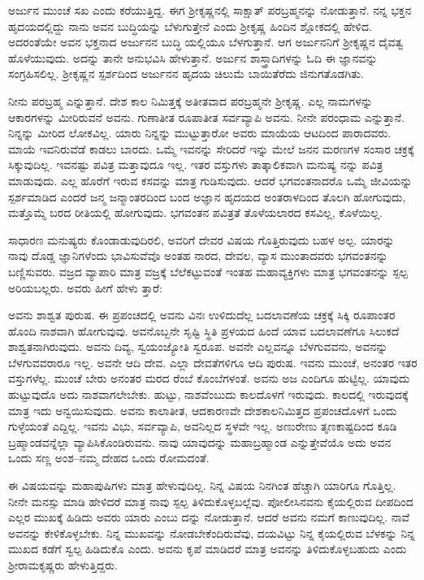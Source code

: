 ಅರ್ಜುನ ಮುಂಚೆ ಸಖ ಎಂದು ಕರೆಯುತ್ತಿದ್ದ. ಈಗ ಶ್ರೀಕೃಷ್ಣನಲ್ಲಿ ಸಾಕ್ಷಾತ್ ಪರಬ್ರಹ್ಮನನ್ನು ನೋಡುತ್ತಾನೆ. ನನ್ನ ಭಕ್ತನ ಹೃದಯದಲ್ಲಿದ್ದು ನಾನು ಅವನ ಬುದ್ಧಿಯನ್ನು ಬೆಳುಗುತ್ತೇನೆ ಎಂದು ಶ್ರೀಕೃಷ್ಣ ಹಿಂದಿನ ಶ್ಲೋಕದಲ್ಲಿ ಹೇಳಿದ. ಅದರಂತೆಯೇ ಅವನ ಭಕ್ತನಾದ ಅರ್ಜುನನ ಬುದ್ಧಿ ಯಲ್ಲಿಯೂ ಬೆಳಗುತ್ತಾನೆ. ಆಗ ಅರ್ಜುನನಿಗೆ ಶ್ರೀಕೃಷ್ಣನ ದೈವತ್ವ ಹೊಳೆಯುವುದು. ಅದನ್ನು ತಾನೇ ಅನುಭವಿಸಿ ಹೇಳುತ್ತಾನೆ. ಅರ್ಜುನ ಶಾಸ್ತ್ರಾದಿಗಳನ್ನು ಓದಿ ಈ ಜ್ಞಾನವನ್ನು ಸಂಗ್ರಹಿಸಲಿಲ್ಲ. ಶ್ರೀಕೃಷ್ಣನ ಸ್ಪರ್ಶದಿಂದ ಅರ್ಜುನನ ಹೃದಯ ಚಿಲುಮೆ ಬಾಯಿತೆರೆದು ಜಿನುಗತೊಡಗಿತು.

ನೀನು ಪರಬ್ರಹ್ಮ ಎನ್ನುತ್ತಾನೆ. ದೇಶ ಕಾಲ ನಿಮಿತ್ತಕ್ಕೆ ಅತೀತವಾದ ಪರಬ್ರಹ್ಮನೇ ಶ್ರೀಕೃಷ್ಣ. ಎಲ್ಲ ನಾಮಗಳನ್ನು ಆಕಾರಗಳನ್ನು ಮೀರಿರುವನೆ ಅವನು. ಗುಣಾತೀತ ರೂಪಾತೀತ ಸರ್ವವ್ಯಾಪಿ ಅವನು. ನೀನೇ ಪರಂಧಾಮ ಎನ್ನುತ್ತಾನೆ. ನಿನ್ನನ್ನು ಮೀರಿದ ಲೋಕವಿಲ್ಲ. ಯಾರು ನಿನ್ನನ್ನು ಮುಟ್ಟುತ್ತಾರೋ ಅವರು ಮಾಯೆಯ ಆಟದಿಂದ ಪಾರಾದವರು. ಮಾಯೆ ಇವನಿರುವೆಡೆ ಕಾಡಲು ಬಾರದು. ಒಮ್ಮೆ ಇವನನ್ನು ಸೇರಿದರೆ ಇನ್ನು ಮೇಲೆ ಜನನ ಮರಣಗಳ ಸಂಸಾರ ಚಕ್ರಕ್ಕೆ ಸಿಕ್ಕುವುದಿಲ್ಲ. ಇವನಷ್ಟು ಪವಿತ್ರ ಮತ್ತಾವುದೂ ಇಲ್ಲ. ಇತರ ವಸ್ತುಗಳು ತಾತ್ಕಾಲಿಕವಾಗಿ ಮನುಷ್ಯ ನನ್ನು ಪವಿತ್ರ ಮಾಡುವುದು. ಎಲ್ಲ ಹೊರೆಗೆ ಇರುವ ಕಸವನ್ನು ಮಾತ್ರ ಗುಡಿಸುವುದು. ಆದರೆ ಭಗವಂತನಾದರೊ ಒಮ್ಮೆ ಜೀವಿಯನ್ನು ಸ್ಪರ್ಶಮಾಡಿದ ಎಂದರೆ ಜನ್ಮ ಜನ್ಮಾಂತರದಿಂದ ಬಂದ ಅಜ್ಞಾನ ಹೃದಯದ ಅಂತರಾಳದಿಂದ ತೊಲಗಿ ಹೋಗುವುದು, ಮತ್ತೊಮ್ಮೆ ಬರದ ರೀತಿಯಲ್ಲಿ ಹೋಗುವುದು. ಭಗವಂತನ ಪವಿತ್ರತೆ ತೊಳೆಯಲಾರದ ಕಸವಿಲ್ಲ, ಕೊಳೆಯಿಲ್ಲ.

ಸಾಧಾರಣ ಮನುಷ್ಯರು ಕೊಂಡಾಡುವುದಿರಲಿ, ಅವರಿಗೆ ದೇವರ ವಿಷಯ ಗೊತ್ತಿರುವುದು ಬಹಳ ಅಲ್ಪ. ಯಾರನ್ನು ನಾವು ದೊಡ್ಡ ಜ್ಞಾನಿಗಳೆಂದು ಭಾವಿಸುವೆವೊ ಅಂತಹ ನಾರದ, ದೇವಲ, ವ್ಯಾಸ ಮುಂತಾದವರು ಭಗವಂತನನ್ನು ಬಣ್ಣಿಸುವರು. ವಜ್ರದ ವ್ಯಾಪಾರಿ ಮಾತ್ರ ವಜ್ರಕ್ಕೆ ಬೆಲೆಕಟ್ಟುವಂತೆ ಇಂತಹ ಮಹಾವ್ಯಕ್ತಿಗಳು ಮಾತ್ರ ಭಗವಂತನನ್ನು ಸ್ಪಲ್ಪ ಅರಿಯಬಲ್ಲರು. ಅವರು ಹೀಗೆ ಹೇಳು ತ್ತಾರೆ:

ಅವನು ಶಾಶ್ವತ ಪುರುಷ. ಈ ಪ್ರಪಂಚದಲ್ಲಿ ಅವನು ವಿನಃ ಉಳಿದುದೆಲ್ಲ ಬದಲಾವಣೆಯ ಚಕ್ರಕ್ಕೆ ಸಿಕ್ಕಿ ರೂಪಾಂತರ ಹೊಂದಿ ನಾಶವಾಗಿ ಹೋಗುವುವು. ಅವನೊಬ್ಬನೇ ಸೃಷ್ಟಿ ಸ್ಥಿತಿ ಪ್ರಳಯದ ಹಿಂದೆ ಯಾವ ಬದಲಾವಣೆಗೂ ಸಿಲುಕದೆ ಶಾಶ್ವತನಾಗಿರುವುದು. ಅವನು ದಿವ್ಯ, ಸ್ವಯಂಜ್ಯೋತಿ ಸ್ವರೂಪ. ಅವನೇ ಎಲ್ಲವನ್ನೂ ಬೆಳಗುವವನು, ಅವನನ್ನು ಬೆಳಗುವವರಾರೂ ಇಲ್ಲ. ಅವನೇ ಆದಿ ದೇವ. ಎಲ್ಲಾ ದೇವತೆಗಳಿಗೂ ಆದಿ ಪುರುಷ. ಇವನು ಮುಂಚೆ, ಅನಂತರ ಇತರ ವಸ್ತುಗಳೆಲ್ಲ. ಮುಂಚೆ ಬೇರು ಅನಂತರ ಮರದ ರೆಂಬೆ ಕೊಂಬೆಗಳಂತೆ. ಅವನು ಅಜ ಎಂದಿಗೂ ಹುಟ್ಟಿಲ್ಲ. ಯಾವುದು ಹುಟ್ಟುವುದೊ ಅದು ನಾಶವಾಗಲೇಬೇಕು. ಹುಟ್ಟು, ನಾಶವೆಂಬುದು ಕಾಲದೊಳಗೆ ಇರುವುದು. ಕಾಲದಲ್ಲಿ ಇರುವುದಕ್ಕೆ ಮಾತ್ರ ಇದು ಅನ್ವಯಿಸುವುದು. ಅವನು ಕಾಲಾತೀತ, ಆದಕಾರಣವೇ ದೇಶಕಾಲನಿಮಿತ್ತದ ಪ್ರಪಂಚದೊಳಗೆ ಒಂದು ಗುಳ್ಳೆಯಂತೆ ಎದ್ದಿಲ್ಲ. ಇವನು ವಿಭು, ಸರ್ವವ್ಯಾಪಿ, ಅವನಿಲ್ಲದ ಸ್ಥಳವೇ ಇಲ್ಲ. ಅಣುರೇಣು ತೃಣಕಾಷ್ಟದಿಂದ ಕೂಡಿ ಬ್ರಹ್ಮಾಂಡವನ್ನೆಲ್ಲಾ ವ್ಯಾಪಿಸಿಕೊಂಡಿರುವನು. ನಾವು ಯಾವುದನ್ನು ಮಹಾಬ್ರಹ್ಮಾಂಡ ಎನ್ನುತ್ತೇವೆಯೊ ಅದು ಅವನ ಒಂದು ಸಣ್ಣ ಅಂಶ–ನಮ್ಮ ದೇಹದ ಒಂದು ರೋಮದಂತೆ.

ಈ ವಿಷಯವನ್ನು ಮಹಾಪುಷಿಗಳು ಮಾತ್ರ ಹೇಳುವುದಿಲ್ಲ. ನಿನ್ನ ವಿಷಯ ನಿನಗಿಂತ ಹೆಚ್ಚಾಗಿ ಯಾರಿಗೂ ಗೊತ್ತಿಲ್ಲ. ನೀನೇ ಮನಸ್ಸು ಮಾಡಿ ಹೇಳಿದರೆ ಮಾತ್ರ ನಾವು ಸ್ಪಲ್ಪ ತಿಳಿದುಕೊಳ್ಳಬಲ್ಲೆವು. ಪೋಲೀಸಿನವನು ಕೈಯಲ್ಲಿರುವ ದೀಪದಿಂದ ಎಲ್ಲರ ಮುಖಕ್ಕೆ ಹಿಡಿದು ಅವರು ಯಾರು ಎಂಬು ದನ್ನು ನೋಡುತ್ತಾನೆ. ಆದರೆ ಅವನು ನಮಗೆ ಕಾಣುವುದಿಲ್ಲ. ನಾವೆ ಅವನನ್ನು ಕೇಳಿಕೊಳ್ಳಬೇಕು. ನಿನ್ನ ಮುಖವನ್ನು ನೋಡಬೇಕೆಂದಿರುವೆವು, ದಯವಿಟ್ಟು ನಿನ್ನ ಕೈಯಲ್ಲಿರುವ ಬೆಳಕನ್ನು ನಿನ್ನ ಮುಖದ ಕಡೆಗೆ ಸ್ವಲ್ಪ ಹಿಡಿದುಕೊ ಎಂದು. ಅವನು ಕೃಪೆ ಮಾಡಿದರೆ ಮಾತ್ರ ಅವನನ್ನು ತಿಳಿದುಕೊಳ್ಳಬಹುದು ಎಂದು ಶ್ರೀರಾಮಕೃಷ್ಣರು ಹೇಳುತ್ತಿದ್ದರು.

